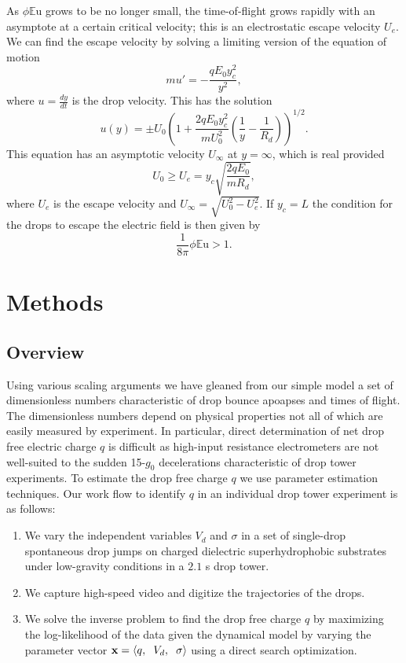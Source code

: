 \documentclass[aip,reprint, floatfix]{revtex4-1}
\begin{document}
As $\phi \mathbb{E}\mbox{u}$ grows to be no longer small, the time-of-flight grows rapidly with an asymptote at a certain critical velocity; this is an electrostatic escape velocity $U_e$. We can find the escape velocity by solving a limiting version of the equation of motion
\[ m u' = - \frac{q E_0 y_c^2}{y^2}, \]
where $u = \frac{d y}{d t}$ is the drop velocity. This has the solution
\[ u(y) = \pm U_0 \left(1 + \frac{2q E_0 y_c^2}{m U_0^2} \left( \frac{1}{y} - \frac{1}{R_d} \right) \right)^{1/2}.
\]
This equation has an asymptotic velocity $U_{\infty}$ at $y = \infty$, which is real provided 
\[ U_0 \geq  U_e = y_c \sqrt{\frac{2 q E_0 }{m R_d}},
\]
where $U_e$ is the escape velocity and $U_{\infty} = \sqrt{U_0^2 - U_e^2}$. If $y_c=L$ the condition for the drops to escape the electric field is then given by
\begin{equation}\label{escape}
\frac{1}{8 \pi} \phi \mathbb{E}\mbox{u} > 1.
\end{equation}

\section{Methods}
\subsection{Overview}
Using various scaling arguments we have gleaned from our simple model a set of dimensionless numbers characteristic of drop bounce apoapses and times of flight. The dimensionless numbers depend on physical properties not all of which are easily measured by experiment. In particular, direct determination of net drop free electric charge $q$ is difficult as high-input resistance electrometers are not well-suited to the sudden 15-$g_0$ decelerations characteristic of drop tower experiments. To estimate the drop free charge $q$ we use parameter estimation techniques. Our work flow to identify $q$ in an individual drop tower experiment is as follows:
\begin{enumerate}
\item We vary the independent variables $V_d$ and $\sigma$ in a set of single-drop spontaneous drop jumps on charged dielectric superhydrophobic substrates under low-gravity conditions in a $2.1$ s drop tower. 
\item We capture high-speed video and digitize the trajectories of the drops. 
\item We solve the inverse problem to find the drop free charge $q$ by maximizing the log-likelihood of the data given the dynamical model by varying the parameter vector $\mathbf{x} = \left\langle q, \hspace{2 mm} V_d, \hspace{2 mm} \sigma \right\rangle$ using a direct search optimization.                     
\end{enumerate}
\end{document}
